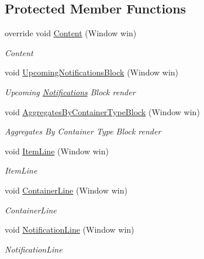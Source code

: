 \subsection*{Protected Member Functions}
\begin{DoxyCompactItemize}
\item 
override void \mbox{\hyperlink{class_gtd_app_1_1_console_1_1_views_1_1_dashboard_view_a29942731cb49497c4f86fc47e3aa3a7e}{Content}} (Window win)
\begin{DoxyCompactList}\small\item\em Content \end{DoxyCompactList}\item 
void \mbox{\hyperlink{class_gtd_app_1_1_console_1_1_views_1_1_dashboard_view_a08ce504861770b776dc12a01687c7284}{Upcoming\+Notifications\+Block}} (Window win)
\begin{DoxyCompactList}\small\item\em Upcoming \mbox{\hyperlink{namespace_gtd_app_1_1_console_1_1_views_1_1_notifications}{Notifications}} Block render \end{DoxyCompactList}\item 
void \mbox{\hyperlink{class_gtd_app_1_1_console_1_1_views_1_1_dashboard_view_a012793d3abf8e916e5b1047d0173b470}{Aggregates\+By\+Container\+Type\+Block}} (Window win)
\begin{DoxyCompactList}\small\item\em Aggregates By Container Type Block render \end{DoxyCompactList}\item 
void \mbox{\hyperlink{class_gtd_app_1_1_console_1_1_views_1_1_dashboard_view_a70b8f162ea582ede995e36fb04598631}{Item\+Line}} (Window win)
\begin{DoxyCompactList}\small\item\em Item\+Line \end{DoxyCompactList}\item 
void \mbox{\hyperlink{class_gtd_app_1_1_console_1_1_views_1_1_dashboard_view_af8abf08009b73e7dbcae292c70f3d150}{Container\+Line}} (Window win)
\begin{DoxyCompactList}\small\item\em Container\+Line \end{DoxyCompactList}\item 
void \mbox{\hyperlink{class_gtd_app_1_1_console_1_1_views_1_1_dashboard_view_a060e23fbcc3915b0b809b4e41d76b094}{Notification\+Line}} (Window win)
\begin{DoxyCompactList}\small\item\em Notification\+Line \end{DoxyCompactList}\item 

\end{DoxyCompactItemize}
